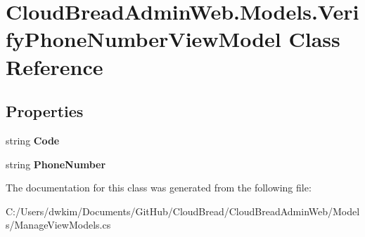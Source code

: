 \hypertarget{class_cloud_bread_admin_web_1_1_models_1_1_verify_phone_number_view_model}{}\section{Cloud\+Bread\+Admin\+Web.\+Models.\+Verify\+Phone\+Number\+View\+Model Class Reference}
\label{class_cloud_bread_admin_web_1_1_models_1_1_verify_phone_number_view_model}
\subsection*{Properties}
\begin{DoxyCompactItemize}
\item 
string {\bfseries Code}\hypertarget{class_cloud_bread_admin_web_1_1_models_1_1_verify_phone_number_view_model_a7d5925e0160fcf20876add7aae3f4463}{}\label{class_cloud_bread_admin_web_1_1_models_1_1_verify_phone_number_view_model_a7d5925e0160fcf20876add7aae3f4463}

\item 
string {\bfseries Phone\+Number}\hypertarget{class_cloud_bread_admin_web_1_1_models_1_1_verify_phone_number_view_model_ad318616ee462e2b328a3ebaf2a56a9ff}{}\label{class_cloud_bread_admin_web_1_1_models_1_1_verify_phone_number_view_model_ad318616ee462e2b328a3ebaf2a56a9ff}

\end{DoxyCompactItemize}


The documentation for this class was generated from the following file\+:\begin{DoxyCompactItemize}
\item 
C\+:/\+Users/dwkim/\+Documents/\+Git\+Hub/\+Cloud\+Bread/\+Cloud\+Bread\+Admin\+Web/\+Models/Manage\+View\+Models.\+cs\end{DoxyCompactItemize}
